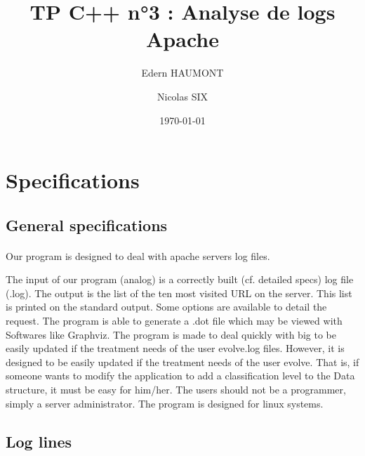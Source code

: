 \documentclass[a4paper, 12pts]{article}
\title{TP C++ n°3 : Analyse de logs Apache}
\author{Edern HAUMONT}
\author{Nicolas SIX}
\affil{B3111}
\date{\today}
\begin{document}

\maketitle



\section{Specifications}
\subsection{General specifications}
\paragraph{}
 Our program is designed to deal with apache servers log files.

The input of our program (analog) is a correctly built (cf. detailed specs) log file (.log). The output is the list of the ten most visited URL on the server. This list is printed on the standard output. Some options are available to detail the request. The program is able to generate a .dot file which may be viewed with Softwares like Graphviz.
 The program is made to deal quickly with big to be easily updated if the treatment needs of the user evolve.log files. However, it is designed to be easily updated if the treatment needs of the user evolve. That is, if someone wants to modify the application to add a classification level to the Data structure, it must be easy for him/her. The users should not be a programmer, simply a server administrator.
 The program is designed for linux systems.

\subsection{Log lines}
\end{document}
